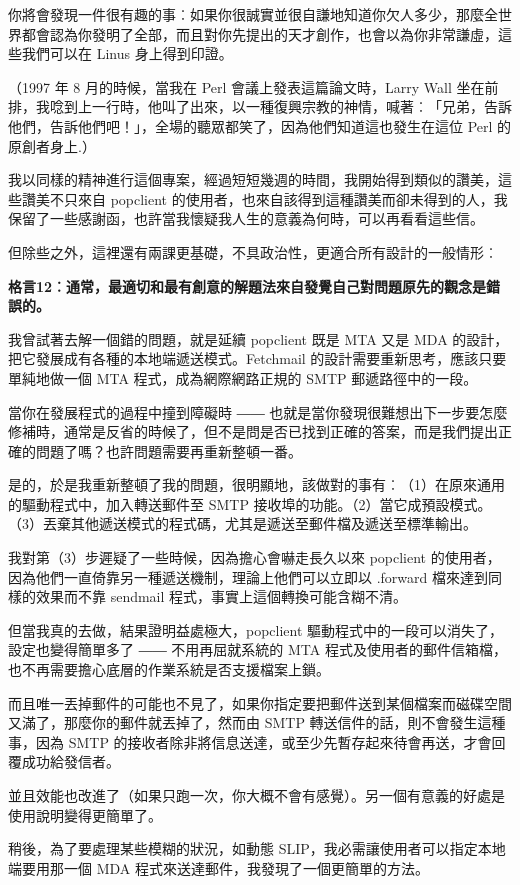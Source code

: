 \documentclass[12pt, a5paper]{book}
\begin{document}
你將會發現一件很有趣的事︰如果你很誠實並很自謙地知道你欠人多少，那麼全世界都會認為你發明了全部，而且對你先提出的天才創作，也會以為你非常謙虛，這些我們可以在
Linus 身上得到印證。

（1997 年 8 月的時候，當我在 Perl 會議上發表這篇論文時，Larry Wall
坐在前排，我唸到上一行時，他叫了出來，以一種復興宗教的神情，喊著︰「兄弟，告訴他們，告訴他們吧！」，全場的聽眾都笑了，因為他們知道這也發生在這位
Perl 的原創者身上.）

我以同樣的精神進行這個專案，經過短短幾週的時間，我開始得到類似的讚美，這些讚美不只來自
popclient
的使用者，也來自該得到這種讚美而卻未得到的人，我保留了一些感謝函，也許當我懷疑我人生的意義為何時，可以再看看這些信。

但除些之外，這裡還有兩課更基礎，不具政治性，更適合所有設計的一般情形︰

\textbf{格言12︰通常，最適切和最有創意的解題法來自發覺自己對問題原先的觀念是錯誤的。}

我曾試著去解一個錯的問題，就是延續 popclient 既是 MTA 又是 MDA
的設計，把它發展成有各種的本地端遞送模式。Fetchmail
的設計需要重新思考，應該只要單純地做一個 MTA 程式，成為網際網路正規的
SMTP 郵遞路徑中的一段。

當你在發展程式的過程中撞到障礙時 ――
也就是當你發現很難想出下一步要怎麼修補時，通常是反省的時候了，但不是問是否已找到正確的答案，而是我們提出正確的問題了嗎？也許問題需要再重新整頓一番。

是的，於是我重新整頓了我的問題，很明顯地，該做對的事有︰（1）在原來通用的驅動程式中，加入轉送郵件至
SMTP
接收埠的功能。（2）當它成預設模式。（3）丟棄其他遞送模式的程式碼，尤其是遞送至郵件檔及遞送至標準輸出。

我對第（3）步遲疑了一些時候，因為擔心會嚇走長久以來 popclient
的使用者，因為他們一直倚靠另一種遞送機制，理論上他們可以立即以 .forward
檔來達到同樣的效果而不靠 sendmail 程式，事實上這個轉換可能含糊不清。

但當我真的去做，結果證明益處極大，popclient
驅動程式中的一段可以消失了，設定也變得簡單多了 ―― 不用再屈就系統的 MTA
程式及使用者的郵件信箱檔，也不再需要擔心底層的作業系統是否支援檔案上鎖。

而且唯一丟掉郵件的可能也不見了，如果你指定要把郵件送到某個檔案而磁碟空間又滿了，那麼你的郵件就丟掉了，然而由
SMTP 轉送信件的話，則不會發生這種事，因為 SMTP
的接收者除非將信息送達，或至少先暫存起來待會再送，才會回覆成功給發信者。

並且效能也改進了（如果只跑一次，你大概不會有感覺）。另一個有意義的好處是使用說明變得更簡單了。

稍後，為了要處理某些模糊的狀況，如動態
SLIP，我必需讓使用者可以指定本地端要用那一個 MDA
程式來送達郵件，我發現了一個更簡單的方法。
\end{document}

